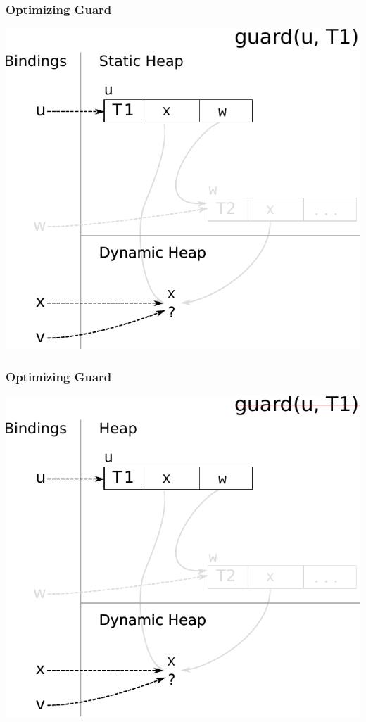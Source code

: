 \documentclass[utf8x]{beamer}
\begin{document}
\begin{frame}[plain]
  \frametitle{Optimizing Guard}
  \includegraphics[scale=0.8]{figures/opt_guard1}
\end{frame}

\begin{frame}[plain]
  \frametitle{Optimizing Guard}
  \includegraphics[scale=0.8]{figures/opt_guard2}
\end{frame}
\end{document}
